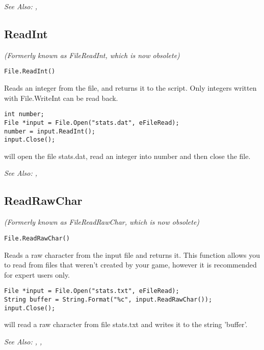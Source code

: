 \it{See Also:} , 


\subsection{ReadInt}\label{File.ReadInt}%

\it{(Formerly known as FileReadInt, which is now obsolete)}

\begin{verbatim}
File.ReadInt()
\end{verbatim}
Reads an integer from the file, and returns it to the script.
Only integers written with File.WriteInt can be read back.

\begin{verbatim}
int number;
File *input = File.Open("stats.dat", eFileRead);
number = input.ReadInt();
input.Close();
\end{verbatim}
will open the file stats.dat, read an integer into number and then close the file.

\it{See Also:} , 


\subsection{ReadRawChar}\label{File.ReadRawChar}%

\it{(Formerly known as FileReadRawChar, which is now obsolete)}

\begin{verbatim}
File.ReadRawChar()
\end{verbatim}
Reads a raw character from the input file and returns it. This function
allows you to read from files that weren't created by your game,
however it is recommended for expert users only.

\begin{verbatim}
File *input = File.Open("stats.txt", eFileRead);
String buffer = String.Format("%c", input.ReadRawChar());
input.Close();
\end{verbatim}
will read a raw character from file stats.txt and writes it to the string 'buffer'.

\it{See Also:} , ,


